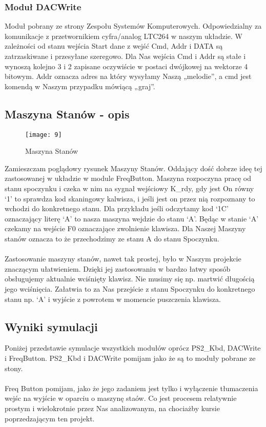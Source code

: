 \documentclass[11pt]{article}
\begin{document}
	\subsubsection{Moduł DACWrite}
	Moduł pobrany ze strony Zespołu Systemów Komputerowych. Odpowiedzialny za komunikacje z przetwornikiem cyfra/analog LTC264 w naszym układzie. W zależności od stanu wejścia Start dane z wejść Cmd, Addr i DATA są zatrzaskiwane i przesyłane szeregowo. Dla Nas wejścia Cmd i Addr są stałe i wynoszą kolejno 3 i 2 zapisane oczywiście w postaci dwójkowej na wektorze 4 bitowym. Addr oznacza adres na który wysyłamy Naszą „melodie”, a cmd jest komendą w Naszym przypadku mówiącą „graj”. \cite{4}
	
	\subsection{Maszyna Stanów - opis}
	
	\begin{figure}[H]
		\centering
		\texttt{[image: 9]}
		\caption{Maszyna Stanów}
		\label{fig:7}
	\end{figure}
	
	
	Zamieszczam poglądowy rysunek Maszyny Stanów. Oddający dość dobrze ideę tej zastosowanej w układzie w module FreqButton. Maszyna rozpoczyna pracę od stanu spoczynku i czeka w nim na sygnał wejściowy K\_rdy, gdy jest On równy ‘1’ to sprawdza kod skaningowy kalwisza, i jeśli jest on przez nią rozpoznany to wchodzi do konkretnego stanu. Dla przykładu jeśli odczytamy kod ‘1C’ oznaczający literę ‘A’ to nasza maszyna wejdzie do stanu ‘A’. Będąc w stanie ‘A’ czekamy na wejście F0 oznaczające zwolnienie klawisza. Dla Naszej Maszyny stanów oznacza to że przechodzimy ze stanu A do stanu Spoczynku.\\\\Zastosowanie maszyny stanów, nawet tak prostej, było w Naszym projekcie znaczącym ułatwieniem. Dzięki jej zastosowaniu w bardzo łatwy sposób obsługujemy aktualnie wciśnięty klawisz. Nie musimy się np. martwić długością jego wciśnięcia. Załatwia to za Nas przejście  z stanu Spoczynku do konkretnego stanu np. ‘A’ i wyjście z powrotem w momencie puszczenia klawisza.
	
	\subsection{Wyniki symulacji}
	
	Poniżej przedstawie symulacje wszystkich modułów oprócz PS2\_Kbd, DACWrite i FreqButton. PS2\_Kbd i DACWrite pomijam jako że są to moduły pobrane ze stony.\cite{4}\\\\Freq Button pomijam, jako że jego zadaniem jest tylko i wyłączenie tłumaczenia wejśc na wyjście w oparciu o maszynę staów. Co jest procesem relatywnie prostym i wielokrotnie przez Nas analizowanym, na chociażby kursie poprzedzającym ten projekt.
	
\end{document}
